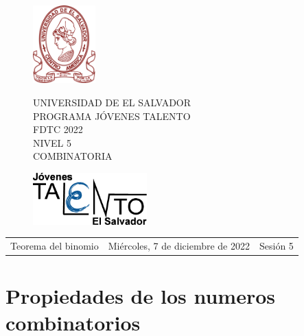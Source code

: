 \documentclass[12pt]{article}
\newcommand{\tema}{Teorema del binomio}
\newcommand{\fecha}{Miércoles, 7 de diciembre de 2022}
\newcommand{\sesion}{Sesión 5}
\begin{document}
\thispagestyle{empty}

\begin{figure}[h] 
	\begin{minipage}[b]{0.26\textwidth}
		\begin{center}
			\includegraphics[height=3cm]{Logos/UES.png}
			\par\end{center}
	\end{minipage} 
	\begin{minipage}[b]{0.46\textwidth}
		\begin{center}
			UNIVERSIDAD DE EL SALVADOR\\ [0.1cm]
			PROGRAMA JÓVENES TALENTO\\ [0.1cm]
	        FDTC 2022\\ [0.1cm]
                NIVEL 5\\ [0.1cm]
			COMBINATORIA 
			\par\end{center}
	\end{minipage} 
	\begin{minipage}[b]{0.05\textwidth}
		\begin{center}
			\includegraphics[height=2cm]{Logos/LOGO PJT.png}
			\par\end{center}
	\end{minipage}
\end{figure}

\begin{center}
    \begin{tabular}{p{4.5cm} p{7cm} p{4.5cm}}
        \tema & \centering\fecha & \hfill\sesion
    \end{tabular}
\end{center}

\section{Propiedades de los numeros combinatorios}
\end{document}

